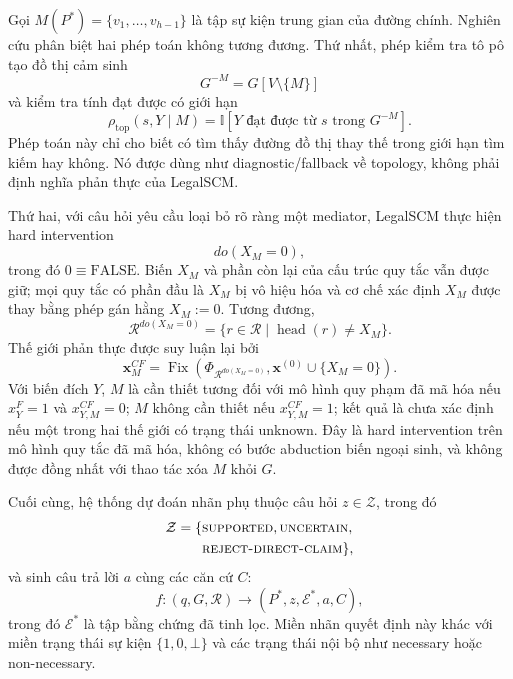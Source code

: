 Gọi $M(P^*)=\{v_1,\ldots,v_{h-1}\}$ là tập sự kiện trung gian của đường chính.
Nghiên cứu phân biệt hai phép toán không tương đương. Thứ nhất, phép kiểm tra tô
pô tạo đồ thị cảm sinh
\begin{equation}
G^{-M}=G[V\setminus\{M\}]
\end{equation}
và kiểm tra tính đạt được có giới hạn
\begin{equation}
\rho_{\mathrm{top}}(s,Y\mid M)
=
\mathbb{I}[Y\text{ đạt được từ }s\text{ trong }G^{-M}].
\label{eq:topological_ablation}
\end{equation}
Phép toán này chỉ cho biết có tìm thấy đường đồ thị thay thế trong giới hạn tìm
kiếm hay không. Nó được dùng như diagnostic/fallback về topology, không phải
định nghĩa phản thực của LegalSCM.

Thứ hai, với câu hỏi yêu cầu loại bỏ rõ ràng một mediator, LegalSCM thực hiện
hard intervention
\begin{equation}
do(X_M=0),
\label{eq:problem_do}
\end{equation}
trong đó $0\equiv\mathrm{FALSE}$. Biến $X_M$ và phần còn lại của cấu trúc quy
tắc vẫn được giữ; mọi quy tắc có phần đầu là $X_M$ bị vô hiệu hóa và cơ chế xác
định $X_M$ được thay bằng phép gán hằng $X_M:=0$. Tương đương,
\begin{equation}
\mathcal{R}^{do(X_M=0)}
=
\{r\in\mathcal{R}\mid \operatorname{head}(r)\neq X_M\}.
\end{equation}
Thế giới phản thực được suy luận lại bởi
\begin{equation}
\mathbf{x}^{CF}_{M}
=
\operatorname{Fix}\!\left(
\Phi_{\mathcal{R}^{do(X_M=0)}},
\mathbf{x}^{(0)}\cup\{X_M=0\}
\right).
\label{eq:cf_fixed_point}
\end{equation}
Với biến đích $Y$, $M$ là cần thiết tương đối với mô hình quy phạm đã mã hóa nếu
$x_Y^{F}=1$ và $x_{Y,M}^{CF}=0$; $M$ không cần thiết nếu
$x_{Y,M}^{CF}=1$; kết quả là chưa xác định nếu một trong hai thế giới có trạng
thái unknown. Đây là hard intervention trên mô hình quy tắc đã mã hóa, không có
bước abduction biến ngoại sinh, và không được đồng nhất với thao tác xóa $M$
khỏi $G$.

Cuối cùng, hệ thống dự đoán nhãn phụ thuộc câu hỏi $z\in\mathcal{Z}$, trong đó
\begin{equation}
\begin{aligned}
\mathcal{Z}=\{&\textsc{supported},\textsc{uncertain},\\
&\textsc{reject-direct-claim}\},
\end{aligned}
\end{equation}
và sinh câu trả lời $a$ cùng các căn cứ $C$:
\begin{equation}
f:(q,G,\mathcal{R})\rightarrow(P^*,z,\mathcal{E}^*,a,C),
\end{equation}
trong đó $\mathcal{E}^*$ là tập bằng chứng đã tinh lọc. Miền nhãn quyết định này
khác với miền trạng thái sự kiện $\{1,0,\bot\}$ và các trạng thái nội bộ như
necessary hoặc non-necessary.
